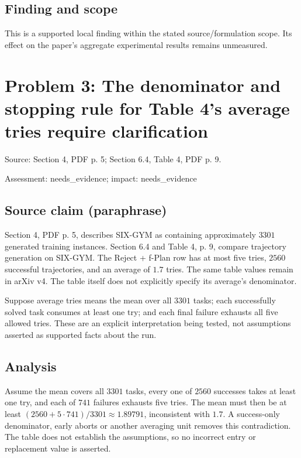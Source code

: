 \documentclass[11pt]{article}
\begin{document}
\subsection*{Finding and scope}

This is a supported local finding within the stated source/formulation scope. Its effect on the paper's aggregate experimental results remains unmeasured.

\section*{Problem 3: The denominator and stopping rule for Table 4’s average tries require clarification}

Source: Section 4, PDF p. 5; Section 6.4, Table 4, PDF p. 9.

Assessment: needs\_evidence; impact: needs\_evidence

\subsection*{Source claim (paraphrase)}

Section 4, PDF p. 5, describes SIX-GYM as containing approximately \(3301\) generated training instances. Section 6.4 and Table 4, p. 9, compare trajectory generation on SIX-GYM. The Reject + f-Plan row has at most five tries, \(2560\) successful trajectories, and an average of \(1.7\) tries. The same table values remain in arXiv v4. The table itself does not explicitly specify its average’s denominator.

Suppose average tries means the mean over all \(3301\) tasks; each successfully solved task consumes at least one try; and each final failure exhausts all five allowed tries. These are an explicit interpretation being tested, not assumptions asserted as supported facts about the run.

\subsection*{Analysis}

Assume the mean covers all \(3301\) tasks, every one of \(2560\) successes takes at least one try, and each of \(741\) failures exhausts five tries. The mean must then be at least \((2560+5\cdot741)/3301\approx1.89791\), inconsistent with \(1.7\). A success-only denominator, early aborts or another averaging unit removes this contradiction. The table does not establish the assumptions, so no incorrect entry or replacement value is asserted.
\end{document}
